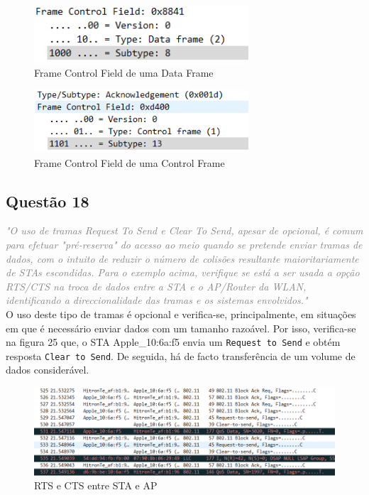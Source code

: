 \documentclass{llncs}
\newcommand{\questionE}[1]{\textcolor{gray}{\textit{"#1"}}}
\begin{document}
\begin{figure}[H]
\begin{center}
\includegraphics[width=8cm]{17a.PNG}
\end{center}
\caption{Frame Control Field de uma Data Frame}
\end{figure}

\begin{figure}[H]
\begin{center}
\includegraphics[width=8cm]{17b.PNG}
\end{center}
\caption{Frame Control Field de uma Control Frame}
\end{figure}

\clearpage

\subsection*{Questão 18}
\hspace{3mm} 
\questionE{O uso de tramas Request To Send e Clear To Send, apesar de opcional, é comum para efetuar "pré-reserva" do acesso ao meio quando se pretende enviar tramas de dados, com o intuito de reduzir o número de colisões resultante maioritariamente de STAs escondidas. Para o exemplo acima, verifique se está a ser usada a opção RTS/CTS na troca de dados entre a STA e o AP/Router da WLAN, identificando a direccionalidade das tramas e os sistemas envolvidos.}\\ 

O uso deste tipo de tramas é opcional e verifica-se, principalmente, em situações em que é necessário enviar dados com um tamanho razoável. Por isso, verifica-se na figura 25 que, o STA Apple\_10:6a:f5 envia um \texttt{Request to Send} e obtém resposta \texttt{Clear to Send}. De seguida, há de facto transferência de um volume de dados considerável.

\begin{figure}[H]
\begin{center}
\includegraphics[width=12cm]{18.PNG}
\end{center}
\caption{RTS e CTS entre STA e AP}
\end{figure}
\end{document}
